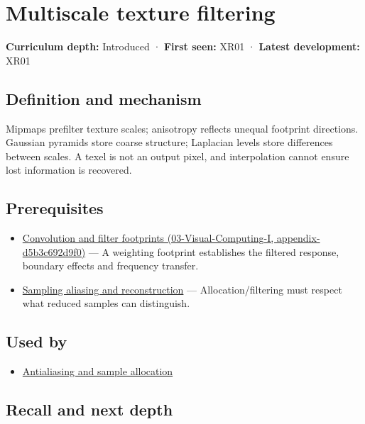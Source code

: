 \hypertarget{appendix-b677a85ba76f}{}
\section{Multiscale texture filtering}\label{appendix-b677a85ba76f-multiscale-texture-filtering}

\textbf{Curriculum depth:} Introduced · \textbf{First seen:} XR01 · \textbf{Latest development:} XR01

\subsection{Definition and mechanism}\label{appendix-b677a85ba76f-definition-and-mechanism}

Mipmaps prefilter texture scales; anisotropy reflects unequal footprint directions. Gaussian pyramids store coarse structure; Laplacian levels store differences between scales. A texel is not an output pixel, and interpolation cannot ensure lost information is recovered.

\subsection{Prerequisites}\label{appendix-b677a85ba76f-prerequisites}

\begin{itemize}
\tightlist
\item
  \href{../03-Visual-Computing-I/main.pdf\#nameddest=appendix-d5b3c692d9f0}{Convolution and filter footprints (03-Visual-Computing-I, appendix-d5b3c692d9f0)} --- A weighting footprint establishes the filtered response, boundary effects and frequency transfer.
\item
  \hyperref[appendix-6a7869dd79a6]{Sampling aliasing and reconstruction} --- Allocation/filtering must respect what reduced samples can distinguish.
\end{itemize}

\subsection{Used by}\label{appendix-b677a85ba76f-used-by}

\begin{itemize}
\tightlist
\item
  \hyperref[appendix-4192b2bdd21e]{Antialiasing and sample allocation}
\end{itemize}

\subsection{Recall and next depth}\label{appendix-b677a85ba76f-recall-and-next-depth}

